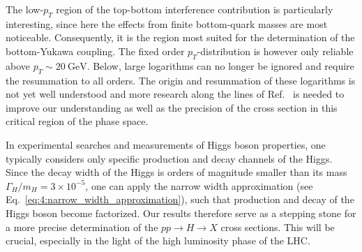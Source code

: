 The low-$p_T$ region of the top-bottom interference contribution is particularly interesting, since here the effects from finite bottom-quark masses are most noticeable. Consequently, it is the region most suited for the determination of the bottom-Yukawa coupling. The fixed order $p_T$-distribution is however only reliable above $p_T \sim 20 \ \mathrm{GeV}$. Below, large logarithms can no longer be ignored and require the resummation to all orders. The origin and resummation of these logarithms is not yet well understood and more research along the lines of Ref.~\cite{Caola:2018zye, Liu:2017vkm} is needed to improve our understanding as well as the precision of the cross section in this critical region of the phase space.

In experimental searches and measurements of Higgs boson properties, one typically considers only specific production and decay channels of the Higgs. Since the decay width of the Higgs is orders of magnitude smaller than its mass $\Gamma_H /m_H = 3 \times 10^{-5}$, one can apply the narrow width approximation (see Eq.~\eqref{eq:4:narrow_width_approximation}), such that production and decay of the Higgs boson become factorized. Our results therefore serve as a stepping stone for a more precise determination of the $pp \rightarrow H \rightarrow X$ cross sections. This will be crucial, especially in the light of the high luminosity phase of the \acs{LHC}.